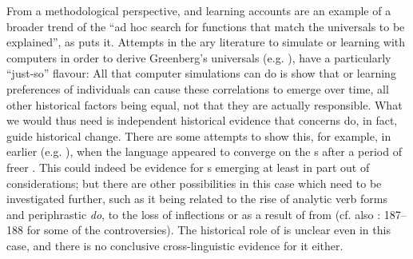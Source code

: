 \documentclass[output=paper]{langsci/langscibook}
\begin{document}
From a methodological perspective,  and learning accounts are an example of a broader trend of the “ad hoc search for functions that match the universals to be explained”, as \citet[13]{Kirby1999} puts it. Attempts in the ary literature to simulate  or learning with computers in order to derive Greenberg’s  universals (e.g. \citealt{VanEverbroeck1999,KirbyChristiansen2003}), have a particularly “just-so” flavour: All that computer simulations can do is show that  or learning preferences of individuals can cause these correlations to emerge over time, all other historical factors being equal, not that they are actually responsible. What we would thus need is independent historical evidence that  concerns do, in fact, guide historical change. There are some attempts to show this, for example, in earlier  (e.g. \citealt{Fischer1992,ClarkEtAl2008}), when the language appeared to converge on the s after a period of freer . This could indeed be evidence for s emerging at least in part out of  considerations; but there are other possibilities in this case which need to be investigated further, such as it being related to the rise of analytic verb forms and periphrastic \textit{do}, to the loss of inflections or as a result of  from  (cf. also  \citealt{FischervanderWurff2006}: 187–188 for some of the controversies). The historical role of  is unclear even in this case, and there is no conclusive cross-linguistic evidence for it either.
\end{document}
